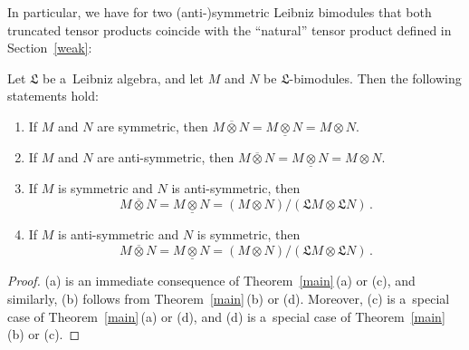 \documentclass{jonasart}
\newcommand{\lf}{\mathfrak{L}}
\newcommand{\ovo}{\overline{\otimes}}
\newcommand{\und}{\underline{\otimes}}
\begin{document}
	In particular, we have for two (anti-)symmetric Leibniz bimodules that both truncated tensor products coincide with the ``natural'' tensor product defined in Section~\ref{weak}:
	\begin{corollary}\label{sym}
		Let $\lf$ be a~Leibniz algebra, and let $M$ and $N$ be $\lf$-bimodules. Then the following statements hold:
		\begin{enumerate}
			\item[\textrm{(a)}] If $M$ and $N$ are symmetric, then $M\ovo N
			=M\und N=M\otimes N$.
			\item[\textrm{(b)}] If $M$ and $N$ are anti-symmetric, then $M
			\ovo N=M\und N=M\otimes N$.
			\item[\textrm{(c)}] If $M$ is symmetric and $N$ is anti-symmetric, then
			\[
				M\ovo N=M\und N=(M\otimes N)/(\lf M
				\otimes\lf N)\,.
			\]
			\item[\textrm{(d)}] If $M$ is anti-symmetric and $N$ is symmetric, then
			\[
				M\ovo N=M\und N=(M\otimes N)/(\lf M
				\otimes\lf N)\,.
			\]
		\end{enumerate}
	\end{corollary}

	\begin{proof}
		(a) is an immediate consequence of Theorem~\ref{main}\,(a) or
		(c), and similarly, (b) follows from Theorem~\ref{main}\,(b) or
		(d). Moreover, (c) is a~special case of Theorem~\ref{main}\,(a)
		or (d), and (d) is a~special case of Theorem~\ref{main}\,(b) or
		(c).
	\end{proof}
\end{document}
